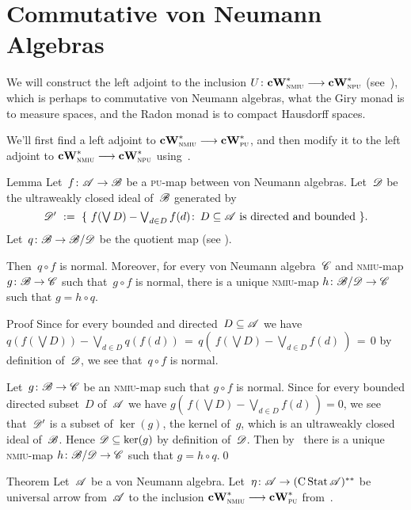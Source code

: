 \documentclass[main]{subfiles}
\begin{document}
\chapter{Commutative von Neumann Algebras}
\begin{parsec}%
\begin{point}%
We will construct the left adjoint
to the inclusion $U\colon \mathbf{cW}^*_{\text{\textsc{nmiu}}}\longrightarrow \mathbf{cW}^*_{\text{\textsc{npu}}}$
(see~),
which 
is perhaps to commutative von Neumann algebras,
what the Giry monad is to  measure spaces,
and the Radon monad is to compact Hausdorff spaces.

We'll first find a left adjoint to $\mathbf{cW}^*_{\text{\textsc{nmiu}}}\longrightarrow \mathbf{cW}^*_{\text{\textsc{pu}}}$,
and then modify it
to the left adjoint to $\mathbf{cW}^*_{\text{\textsc{nmiu}}}\longrightarrow \mathbf{cW}^*_{\text{\textsc{npu}}}$
using~.
\end{point}
\begin{point}{Lemma}%
Let~$f\colon \mathscr{A}\to\mathscr{B}$
be a \textsc{pu}-map between
von Neumann algebras.
Let~$\mathscr{D}$ be the ultraweakly closed ideal of~$\mathscr{B}$
generated by
\begin{equation*}
\textstyle
\mathscr{D}' \ :=\ \{\ f(\bigvee D)-\bigvee_{d\in D}f(d)\colon \, 
D\subseteq \mathscr{A}\text{ is directed and bounded}\ \}.
\end{equation*}
Let~$q\colon \mathscr{B}\to \mathscr{B}/\mathscr{D}$ be the quotient
map (see ).

Then~$q\circ f$ is normal.
Moreover,
for every von Neumann algebra~$\mathscr{C}$
and \textsc{nmiu}-map $g\colon \mathscr{B}\to \mathscr{C}$
such that~$g\circ f$ is normal,
there is a unique \textsc{nmiu}-map $h\colon \mathscr{B}/\mathscr{D}\to \mathscr{C}$
such that $g=h \circ q$.
\begin{point}{Proof}%
Since for every bounded and directed~$D\subseteq \mathscr{A}$
we have
$q(f(\bigvee D)) - \bigvee_{d\in D}q(f(d))
\,=\, q(\ f(\bigvee D)-\bigvee_{d\in D}f(d)\ ) \,=\, 0$
by definition of~$\mathscr{D}$,
we see that~$q\circ f$ is normal.
\end{point}
\begin{point}%
Let~$g\colon \mathscr{B}\to \mathscr{C}$ be an \textsc{nmiu}-map
such that $g\circ f$ is normal.
Since for every bounded directed subset~$D$ of~$\mathscr{A}$
we have $g(\,f(\bigvee D)-\bigvee_{d\in D}f(d)\,)=0$,
we see that~$\mathscr{D}'$ is a subset of $\ker(g)$, the kernel of~$g$,
which is an ultraweakly closed ideal of~$\mathscr{B}$.
Hence $\mathscr{D}\subseteq \ker(g)$ by definition of~$\mathscr{D}$.
Then by~
there is a unique \textsc{nmiu}-map $h\colon \mathscr{B}/\mathscr{D}\to \mathscr{C}$
such that $g=h\circ q$.\qed
\end{point}
\end{point}
\begin{point}[cw-giry]{Theorem}%
Let~$\mathscr{A}$ be a von Neumann algebra.
Let~$\eta\colon\mathscr{A}\to (\operatorname{C}\operatorname{Stat}\mathscr{A})^{**}$
be universal arrow from~$\mathscr{A}$ to
the inclusion $\mathbf{cW}^*_{\text{\textsc{nmiu}}}\longrightarrow \mathbf{cW}^*_{\text{\textsc{pu}}}$
from~.


\end{point}
\end{parsec}
\end{document}
